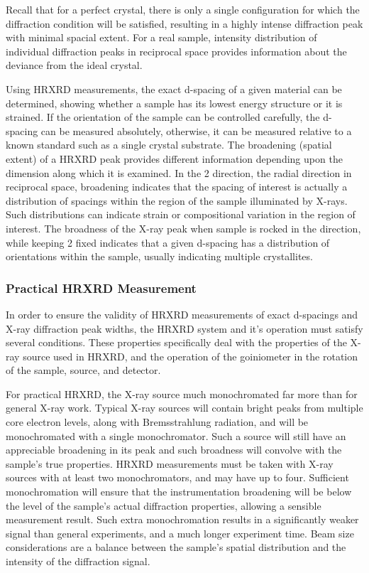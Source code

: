 Recall that for a perfect crystal, there is only a single configuration for which the diffraction condition will be satisfied, resulting in a highly intense diffraction peak with minimal spacial extent.
For a real sample, intensity distribution of individual diffraction peaks in reciprocal space provides information about the deviance from the ideal crystal.

Using HRXRD measurements, the exact d-spacing of a given material can be determined, showing whether a sample has its lowest energy structure or it is strained.
If the orientation of the sample can be controlled carefully, the d-spacing can be measured absolutely, otherwise, it can be measured relative to a known standard such as a single crystal substrate.
The broadening (spatial extent) of a HRXRD peak provides different information depending upon the dimension along which it is examined.
In the 2\straighttheta{} direction, the radial direction in reciprocal space, broadening indicates that the spacing of interest is actually a distribution of spacings within the region of the sample illuminated by X-rays.
Such distributions can indicate strain or compositional variation in the region of interest.
The broadness of the X-ray peak when sample is rocked in the \textomega{} direction, while keeping 2\straighttheta{} fixed indicates that a given d-spacing has a distribution of orientations within the sample, usually indicating multiple crystallites.

\subsubsection{Practical HRXRD Measurement} In order to ensure the validity of HRXRD measurements of exact d-spacings and X-ray diffraction peak widths, the HRXRD system and it's operation must satisfy several conditions.
These properties specifically deal with the properties of the X-ray source used in HRXRD, and the operation of the goiniometer in the rotation of the sample, source, and detector.

For practical HRXRD, the X-ray source much monochromated far more than for general X-ray work.
Typical X-ray sources will contain bright peaks from multiple core electron levels, along with Bremsstrahlung radiation, and will be monochromated with a single monochromator.
Such a source will still have an appreciable broadening in its peak and such broadness will convolve with the sample's true properties.
HRXRD measurements must be taken with X-ray sources with at least two monochromators, and may have up to four.
Sufficient monochromation will ensure that the instrumentation broadening will be below the level of the sample's actual diffraction properties, allowing a sensible measurement result.
Such extra monochromation results in a significantly weaker signal than general experiments, and a much longer experiment time.
Beam size considerations are a balance between the sample's spatial distribution and the intensity of the diffraction signal.


